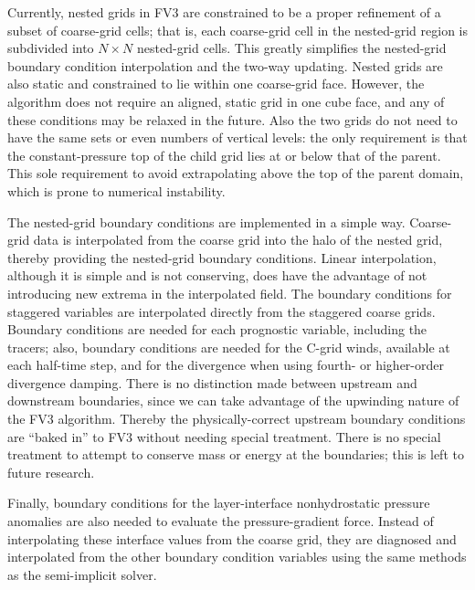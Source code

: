 \documentclass[10pt,letterpaper,margin=1in]{memoir}
\begin{document}
Currently, nested grids in FV3 are constrained to be a proper refinement of a subset of coarse-grid cells; that is, each coarse-grid cell in the nested-grid region is subdivided into $N\times N$ nested-grid cells. This greatly simplifies the nested-grid boundary condition interpolation and the two-way updating. Nested grids are also static and constrained to lie within one coarse-grid face. However, the algorithm does not require an aligned, static grid in one cube face, and any of these conditions may be relaxed in the future. Also the two grids do not need to have the same sets or even numbers of vertical levels: the only requirement is that the constant-pressure top of the child grid lies at or below that of the parent. This sole requirement to avoid extrapolating above the top of the parent domain, which is prone to numerical instability.

The nested-grid boundary conditions are implemented in a simple way. Coarse-grid data is interpolated from the coarse grid into the halo of the nested grid, thereby providing the nested-grid boundary conditions. Linear interpolation, although it is simple and is not conserving, does have the advantage of not introducing new extrema in the interpolated field. The boundary conditions for  staggered variables are interpolated directly from the staggered coarse grids. Boundary conditions are needed for each prognostic variable, including the tracers; also, boundary conditions are needed for the C-grid winds, available at each half-time step, and for the divergence when using fourth- or higher-order divergence damping. There is no distinction made between upstream and downstream boundaries, since we can take advantage of the upwinding nature of the FV3 algorithm. Thereby the physically-correct upstream boundary conditions are ``baked in'' to FV3 without needing special treatment. There is no special treatment to attempt to conserve mass or energy at the boundaries; this is left to future research.

Finally, boundary conditions for the layer-interface nonhydrostatic pressure anomalies are also needed to evaluate the pressure-gradient force. Instead of interpolating these interface values from the coarse grid, they are diagnosed and interpolated from the other boundary condition variables using the same methods as the semi-implicit solver.
\end{document}
